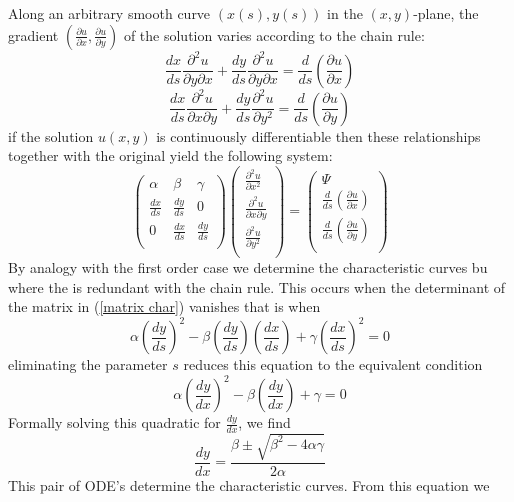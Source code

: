 Along an arbitrary smooth curve $(x(s),y(s))$ in the $(x,y)$-plane, the gradient
$\left( \frac{\partial u}{\partial x}, \frac{\partial u}{\partial y}\right)$ of the solution varies according to the chain rule:
\[ \frac{dx}{ds}\frac{\partial^2u}{\partial y\partial x}+\frac{dy}{ds}\frac{\partial^2 u}{\partial y\partial x}=\frac{d}{ds}\left(\frac{\partial u}{\partial x}\right)\]
\[ \frac{dx}{ds}\frac{\partial^2u}{\partial x \partial y}+\frac{dy}{ds}\frac{\partial^2u}{\partial y^2}=\frac{d}{ds}\left(\frac{\partial u}{\partial y}\right)\]
if the solution $u(x,y)$ is continuously differentiable then these relationships
together with the original  yield the following system:
\begin{equation}
\label{matrix char} 
\left(\begin{array}{ccc}
\alpha & \beta & \gamma \\
\frac{dx}{ds}&\frac{dy}{ds}&0\\
0&\frac{dx}{ds}&\frac{dy}{ds}\\
\end{array}\right)
\left(\begin{array}{c}
\frac{\partial^2u}{\partial x^2}\\
\frac{\partial^2u}{\partial x\partial y}\\
\frac{\partial^2u}{\partial y^2}\\
\end{array}\right)
=
\left(\begin{array}{c}
\Psi\\
\frac{d}{ds}\left(\frac{\partial u}{\partial x}\right)\\
\frac{d}{ds}\left(\frac{\partial u}{\partial y}\right)\\
\end{array}\right)
\end{equation} 
By analogy with the first order case we determine the characteristic curves bu where the  is redundant  with the chain rule.  This occurs when the determinant
of the matrix in (\ref{matrix char}) vanishes that is when
\[
\alpha\left( \frac{dy}{ds}\right)^2
-
\beta\left( \frac{dy}{ds}\right)\left( \frac{dx}{ds}\right)
+
\gamma\left( \frac{dx}{ds}\right)^2=0
\]
eliminating the parameter $s$ reduces this equation to the equivalent condition
\[
\alpha\left( \frac{dy}{dx}\right)^2
-
\beta\left( \frac{dy}{dx}\right)
+
\gamma
=0
\]
Formally solving this quadratic for $\frac{dy}{dx}$, we find
\[\frac{dy}{dx}=\frac{\beta\pm\sqrt{\beta^2-4\alpha\gamma}}{2\alpha}\]
This pair of ODE's determine the characteristic curves.  From this equation we
